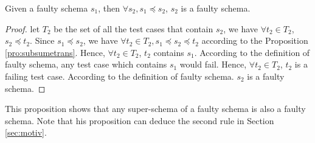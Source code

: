 %
%
%



\begin{proposition}\label{pro:superoffaulty}
Given a faulty schema $s_{1}$, then $\forall s_{2}, s_{1} \preceq s_{2}$, $s_{2}$ is a faulty schema.
\end{proposition}

\begin{proof}
let $T_{2}$ be the set of all the test cases that contain $s_{2}$, we have $\forall t_{2} \in T_{2}$, $s_{2} \preceq t_{2}$.  Since $s_{1} \preceq s_{2}$, we have $\forall t_{2} \in T_{2}, s_{1} \preceq s_{2} \preceq t_{2}$ according to the Proposition \ref{pro:subsumetrans}. Hence, $\forall t_{2} \in T_{2}$, $t_{2}$ contains $s_{1}$. According to the definition of faulty schema, any test case which contains $s_{1}$ would fail. Hence, $\forall t_{2} \in T_{2}$, $t_{2}$ is a failing test case. According to the definition of faulty schema. $s_{2}$ is a faulty schema.
\end{proof}

This proposition shows that any super-schema of a faulty schema is also a faulty schema.  Note that his proposition can deduce the second rule in Section \ref{sec:motiv}.


